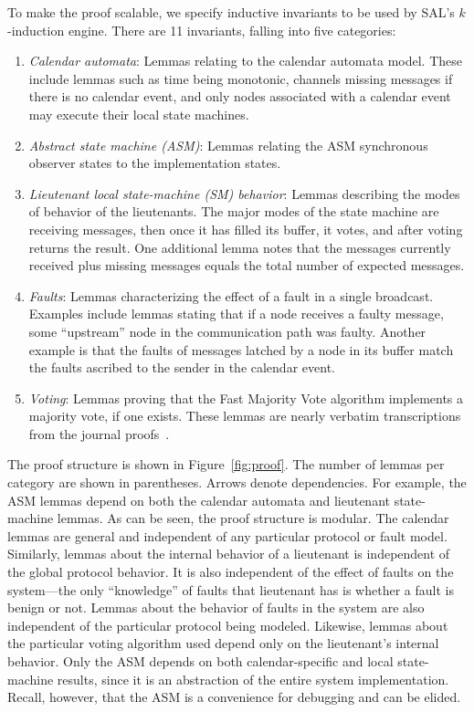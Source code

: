 \documentclass{llncs/llncs}
\begin{document}
To make the proof scalable, we specify inductive invariants to be used by SAL's $k$-induction engine. There are 11 invariants, falling into five categories:
\begin{enumerate}
  \item \emph{Calendar automata}: Lemmas relating to the calendar automata model. These include lemmas such as time being monotonic, channels missing messages if there is no calendar event, and only nodes associated with a calendar event may execute their local state machines.
  \item \emph{Abstract state machine (ASM)}: Lemmas relating the ASM synchronous observer states to the implementation states.
  \item \emph{Lieutenant local state-machine (SM) behavior}: Lemmas describing the modes of behavior of the lieutenants. The major modes of the state machine are receiving messages, then once it has filled its buffer, it votes, and after voting returns the result. One additional lemma notes that the messages currently received plus missing messages equals the total number of expected messages.
  \item \emph{Faults}: Lemmas characterizing the effect of a fault in a single broadcast. Examples include lemmas stating that if a node receives a faulty message, some ``upstream'' node in the communication path was faulty. Another example is that the faults of messages latched by a node in its buffer match the faults ascribed to the sender in the calendar event.
  \item \emph{Voting}: Lemmas proving that the Fast Majority Vote algorithm implements a majority vote, if one exists. These lemmas are nearly verbatim transcriptions from the journal proofs~\cite{mjrty}.
\end{enumerate}
\noindent
The proof structure is shown in Figure~\ref{fig:proof}. The number of lemmas per category are shown in parentheses. Arrows denote dependencies. For example, the ASM lemmas depend on both the calendar automata and lieutenant state-machine lemmas. As can be seen, the proof structure is modular. The calendar lemmas are general and independent of any particular protocol or fault model. Similarly, lemmas about the internal behavior of a lieutenant is independent of the global protocol behavior. It is also independent of the effect of faults on the system---the only ``knowledge'' of faults that lieutenant has is whether a fault is benign or not. Lemmas about the behavior of faults in the system are also independent of the particular protocol being modeled. Likewise, lemmas about the particular voting algorithm used depend only on the lieutenant's internal behavior. Only the ASM depends on both calendar-specific and local state-machine results, since it is an abstraction of the entire system implementation. Recall, however, that the ASM is a convenience for debugging and can be elided.
\end{document}
